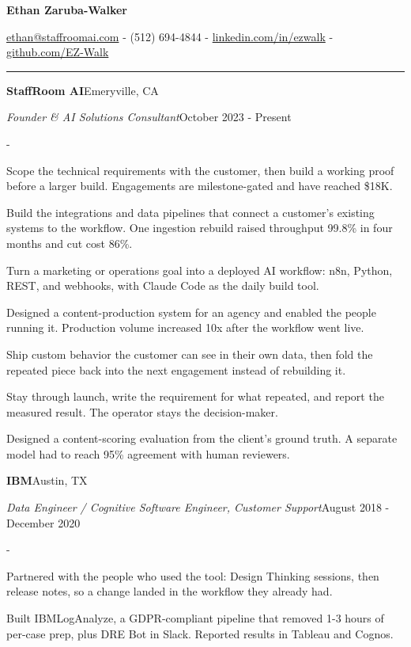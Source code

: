 \documentclass[10pt,letterpaper]{article}
\newenvironment{cvitems}{%
  \begin{list}{-}{%
    \setlength{\leftmargin}{12pt}%
    \setlength{\itemsep}{1.2pt}%
    \setlength{\parsep}{0pt}%
    \setlength{\topsep}{1.5pt}%
    \setlength{\partopsep}{0pt}%
    \setlength{\labelwidth}{6pt}%
    \setlength{\labelsep}{6pt}%
    \setlength{\itemindent}{0pt}%
  }%
}{\end{list}}
\newcommand{\cvsection}[1]{%
  \vspace{7pt}%
  \noindent{\bfseries\fontsize{11pt}{13pt}\selectfont\MakeUppercase{#1}}\par
  \vspace{1pt}%
  \noindent\rule{\textwidth}{0.4pt}\par
  \vspace{4pt}%
}
\newcommand{\cventryhead}[4]{%
  \noindent\textbf{#1}\hfill#2\par
  \vspace{0.5pt}%
  \noindent\textit{#3}\hfill#4\par
}
\begin{document}
\begin{center}
  {\bfseries\fontsize{22pt}{24pt}\selectfont Ethan Zaruba-Walker\par}
  \vspace{4pt}
  {\fontsize{10pt}{12pt}\selectfont
    \href{mailto:ethan@staffroomai.com}{ethan@staffroomai.com}
    {-}
    (512) 694-4844
    {-}
    \href{https://linkedin.com/in/ezwalk}{linkedin.com/in/ezwalk}
    {-}
    \href{https://github.com/EZ-Walk}{github.com/EZ-Walk}\par}
\end{center}
\vspace{2pt}

\cvsection{Experience}

\cventryhead{StaffRoom AI}{Emeryville, CA}
{Founder \& AI Solutions Consultant}{October 2023 - Present}
\begin{cvitems}
  \item Scope the technical requirements with the customer, then build a working proof before a larger build. Engagements are milestone-gated and have reached \$18K.
  \item Build the integrations and data pipelines that connect a customer's existing systems to the workflow. One ingestion rebuild raised throughput 99.8\% in four months and cut cost 86\%.
  \item Turn a marketing or operations goal into a deployed AI workflow: n8n, Python, REST, and webhooks, with Claude Code as the daily build tool.
  \item Designed a content-production system for an agency and enabled the people running it. Production volume increased 10x after the workflow went live.
  \item Ship custom behavior the customer can see in their own data, then fold the repeated piece back into the next engagement instead of rebuilding it.
  \item Stay through launch, write the requirement for what repeated, and report the measured result. The operator stays the decision-maker.
  \item Designed a content-scoring evaluation from the client's ground truth. A separate model had to reach 95\% agreement with human reviewers.
\end{cvitems}

\vspace{3pt}
\cventryhead{IBM}{Austin, TX}
{Data Engineer / Cognitive Software Engineer, Customer Support}{August 2018 - December 2020}
\begin{cvitems}
  \item Partnered with the people who used the tool: Design Thinking sessions, then release notes, so a change landed in the workflow they already had.
  \item Built IBMLogAnalyze, a GDPR-compliant pipeline that removed 1-3 hours of per-case prep, plus DRE Bot in Slack. Reported results in Tableau and Cognos.
\end{cvitems}
\end{document}
